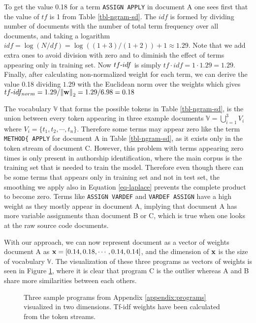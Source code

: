 \noindent
To get the value 0.18 for a term \texttt{ASSIGN APPLY} in document A one sees first that the value of $tf$ is 1 from Table \ref{tbl-ngram-sd}. The $idf$ is formed by dividing number of documents with the number of total term frequency over all documents, and taking a logarithm \ie $idf = \log(N/df) = \log((1+3)/(1+2)) + 1 \approx 1.29$. Note that we add extra ones to avoid division with zero and to diminish the effect of terms appearing only in training set. Now $tf{\text -}idf$ is simply $tf \cdot idf = 1 \cdot 1.29 = 1.29$. Finally, after calculating non-normalized weight for each term, we can derive the value 0.18 dividing $1.29$ with the Euclidean norm over the weights which gives $tf{\text -}idf_{norm} = 1.29 / \! \left\lVert\mathbf{w}\right\rVert_2 = 1.29 / 6.98 = 0.18$

The vocabulary $\mathbb{V}$ that forms the possible tokens in Table \ref{tbl-ngram-sd}, is the union between every token appearing in three example documents \ie $\mathbb{V} = \bigcup_{i=1}^{3} V_i$ where $V_i = \{t_1, t_2, \cdots, t_n\}$. Therefore some terms may appear zero like the term \texttt{METHOD\{ APPLY} for document A in Table \ref{tbl-ngram-sd}, as it exists only in the token stream of document C. However, this problem with terms appearing zero times is only present in authorship identification, where the main corpus is the training set that is needed to train the model. Therefore even though there can be some terms that appears only in training set and not in test set, the smoothing we apply also in Equation \ref{eq-laplace} prevents the complete product to become zero. Terms like \texttt{ASSIGN VARDEF} and \texttt{VARDEF ASSIGN} have a high weight as they mostly appear in document A, implying that document A has more variable assignments than document B or C, which is true when one looks at the raw source code documents. 

With our approach, we can now represent document as a vector of weights \eg document A as $\mathbf{x} = [0.14, 0.18, \cdots, 0.14, 0.14]$, and the dimension of $\mathbf{x}$ is the size of vocabulary $\mathbb{V}$. The visualization of these three programs as vectors of weights is seen in Figure \ref{fig-tfidf}, where it is clear that program C is the outlier whereas A and B share more similarities between each others.

\begin{figure}[!h]
\centering
\setlength\figureheight{7cm}
\setlength\figurewidth{10cm}


\caption{Three sample programs from Appendix \ref{appendix:programs} visualized in two dimensions. Tf-idf weights have been calculated from the token streams.} \label{fig-tfidf}
\end{figure}



